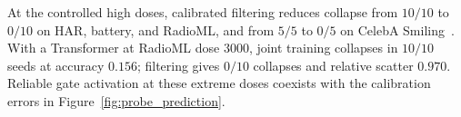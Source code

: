 \label{sec:bmtl}\label{sec:bmtl_ablation}\label{sec:finance}
At the controlled high doses, calibrated filtering reduces collapse from $10/10$ to $0/10$ on HAR, battery, and RadioML, and from $5/5$ to $0/5$ on CelebA Smiling~\citep{liu2015celeba}. With a Transformer at RadioML dose $3000$, joint training collapses in $10/10$ seeds at accuracy $0.156$; filtering gives $0/10$ collapses and relative scatter $0.970$. Reliable gate activation at these extreme doses coexists with the calibration errors in Figure~\ref{fig:probe_prediction}.


